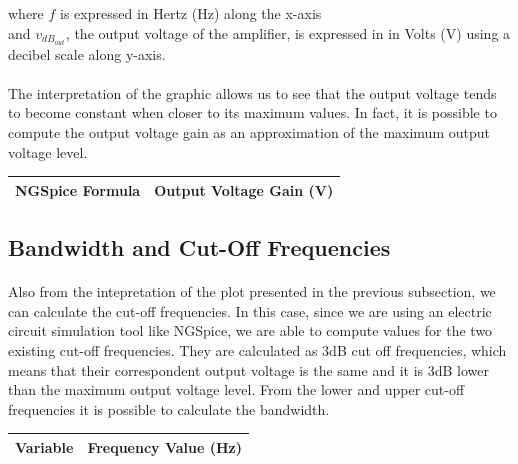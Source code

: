 where $f$ is expressed in Hertz (Hz) along the x-axis\\
and $v_{dB_{out}}$, the output voltage of the amplifier, is expressed in  in Volts (V) using a decibel scale along y-axis.

\paragraph{}
The interpretation of the graphic allows us to see that the output voltage tends to become constant when closer to its maximum values. In fact, it is possible to compute the output voltage gain as an approximation of the maximum output voltage level.


\begin{table}[H] \centering
  \begin{tabular}{|l|r|}
    \hline    
    {\bf NGSpice Formula} & {\bf Output Voltage Gain (V)} \\ \hline
    
  \end{tabular}
 \label{tab:outvoltagegain}
\end{table}


\subsection{Bandwidth and Cut-Off Frequencies}

\paragraph{}
Also from the intepretation of the plot presented in the previous subsection, we can calculate the cut-off frequencies. In this case, since we are using an electric circuit simulation tool like NGSpice, we are able to compute values for the two existing cut-off frequencies. They are calculated as 3dB cut off frequencies, which means that their correspondent output voltage is the same and it is 3dB lower than the maximum output voltage level. From the lower and upper cut-off frequencies it is possible to calculate the bandwidth. 

\begin{table}[H] \centering
  \begin{tabular}{|l|r|}
    \hline    
    {\bf Variable} & {\bf Frequency Value (Hz)} \\ \hline
    
  \end{tabular}
 \label{tab:cutofffreq}
\end{table}

